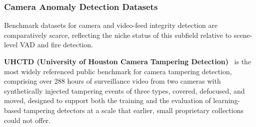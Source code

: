 \documentclass[10pt,a4paper]{article}
\renewcommand{\arraystretch}{1.12}
\begin{document}
\begin{table}[!t]
\centering
\caption{Summary of benchmark datasets for fire and smoke detection. Type: Cls = Classification, Det = Object Detection, Seg = Segmentation.}
\label{tab:fire_datasets}
\renewcommand{\arraystretch}{1.3}
\end{table}


\subsubsection{Camera Anomaly Detection Datasets}
\label{subsubsec:camera_datasets}

Benchmark datasets for camera and video-feed integrity detection are comparatively scarce, reflecting the niche status of this subfield relative to scene-level VAD and fire detection.

\textbf{UHCTD (University of Houston Camera Tampering Detection)}~\citep{mantini2019uhctd} is the most widely referenced public benchmark for camera tampering detection, comprising over 288 hours of surveillance video from two cameras with synthetically injected tampering events of three types, covered, defocused, and moved, designed to support both the training and the evaluation of learning-based tampering detectors at a scale that earlier, small proprietary collections could not offer.
\end{document}
